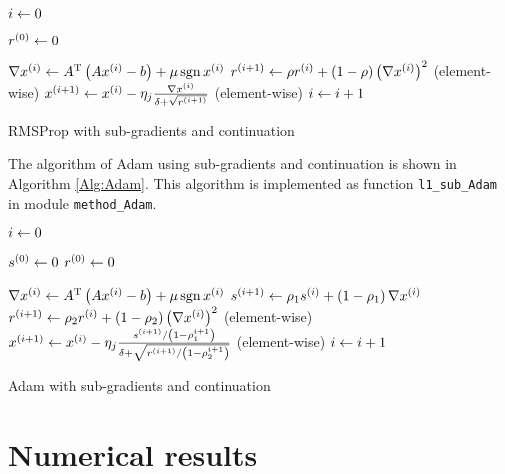 \documentclass[english]{pkupaper}
\begin{document}
\begin{thmquestion}[4]
\begin{thmanswer}
\begin{algorithm}[htbp]
$ i \leftarrow 0 $\;

$ r^{\left( 0 \right)} \leftarrow 0 $\;

{
	{
		$ \nabla x^{\left( i \right)} \leftarrow A^{\mathrm{T}} \left(  A x^{\left( i \right)} - b  \right) + \mu \operatorname{\mathrm{sgn}} x^{\left( i \right)} $\;
		$ r^{\left(  i + 1  \right)} \leftarrow \rho r^{\left( i \right)} + \left(  1 - \rho  \right) \left(  \nabla x^{\left( i \right)}  \right)^2 $ (element-wise)\;
		$ x^{\left(  i + 1  \right)} \leftarrow x^{\left( i \right)} - \eta_j \frac{ \nabla x^{\left( i \right)} }{ \delta + \sqrt{r^{\left(  i + 1  \right)}} } $ (element-wise)\;
		$ i \leftarrow i + 1 $\;
	}
}

\caption{RMSProp with sub-gradients and continuation} \label{Alg:RMSProp}
\end{algorithm}

The algorithm of Adam using sub-gradients and continuation is shown in Algorithm \ref{Alg:Adam}. This algorithm is implemented as function \verb"l1_sub_Adam" in module \verb"method_Adam".

\begin{algorithm}[htbp]
\SetAlgoLined


$ i \leftarrow 0 $\;

$ s^{\left( 0 \right)} \leftarrow 0 $\;
$ r^{\left( 0 \right)} \leftarrow 0 $\;

{
	{
		$ \nabla x^{\left( i \right)} \leftarrow A^{\mathrm{T}} \left(  A x^{\left( i \right)} - b  \right) + \mu \operatorname{\mathrm{sgn}} x^{\left( i \right)} $\;
		$ s^{\left(  i + 1  \right)} \leftarrow \rho_1 s^{\left( i \right)} + \left(  1 - \rho_1  \right) \nabla x^{\left( i \right)} $\;
		$ r^{\left(  i + 1  \right)} \leftarrow \rho_2 r^{\left( i \right)} + \left(  1 - \rho_2  \right) \left(  \nabla x^{\left( i \right)}  \right)^2 $ (element-wise)\;
		$ x^{\left(  i + 1  \right)} \leftarrow x^{\left( i \right)} - \eta_j \frac{ s^{\left(  i + 1  \right)} / \left(  1 - \rho_1^{ i + 1 }  \right) }{ \delta + \sqrt{ r^{\left(  i + 1  \right)} / \left(  1 - \rho_2^{ i + 1 }  \right) } } $ (element-wise)\;
		$ i \leftarrow i + 1 $\;
	}
}

\caption{Adam with sub-gradients and continuation} \label{Alg:Adam}
\end{algorithm}

\end{thmanswer}
\end{thmquestion}

\section{Numerical results}
\end{document}
